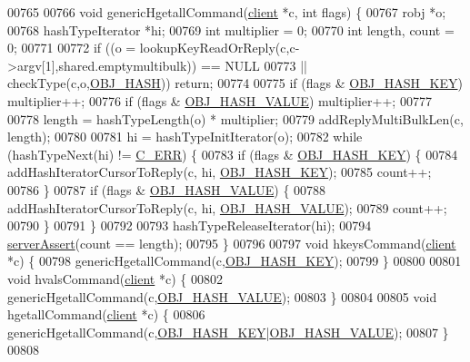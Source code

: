 \begin{DoxyCode}
00765 
00766 \textcolor{keywordtype}{void} genericHgetallCommand(\hyperlink{structclient}{client} *c, \textcolor{keywordtype}{int} flags) \{
00767     robj *o;
00768     hashTypeIterator *hi;
00769     \textcolor{keywordtype}{int} multiplier = 0;
00770     \textcolor{keywordtype}{int} length, count = 0;
00771 
00772     \textcolor{keywordflow}{if} ((o = lookupKeyReadOrReply(c,c->argv[1],shared.emptymultibulk)) == NULL
00773         || checkType(c,o,\hyperlink{server_8h_a87c05ba4f7f36741864277f02a4423fb}{OBJ\_HASH})) \textcolor{keywordflow}{return};
00774 
00775     \textcolor{keywordflow}{if} (flags & \hyperlink{server_8h_aede46b2a96d6f19aff38ccdac76598ac}{OBJ\_HASH\_KEY}) multiplier++;
00776     \textcolor{keywordflow}{if} (flags & \hyperlink{server_8h_a1f87a280688b29cd45aa3aa0dceac7c7}{OBJ\_HASH\_VALUE}) multiplier++;
00777 
00778     length = hashTypeLength(o) * multiplier;
00779     addReplyMultiBulkLen(c, length);
00780 
00781     hi = hashTypeInitIterator(o);
00782     \textcolor{keywordflow}{while} (hashTypeNext(hi) != \hyperlink{server_8h_af98ac28d5f4d23d7ed5985188e6fb7d1}{C\_ERR}) \{
00783         \textcolor{keywordflow}{if} (flags & \hyperlink{server_8h_aede46b2a96d6f19aff38ccdac76598ac}{OBJ\_HASH\_KEY}) \{
00784             addHashIteratorCursorToReply(c, hi, \hyperlink{server_8h_aede46b2a96d6f19aff38ccdac76598ac}{OBJ\_HASH\_KEY});
00785             count++;
00786         \}
00787         \textcolor{keywordflow}{if} (flags & \hyperlink{server_8h_a1f87a280688b29cd45aa3aa0dceac7c7}{OBJ\_HASH\_VALUE}) \{
00788             addHashIteratorCursorToReply(c, hi, \hyperlink{server_8h_a1f87a280688b29cd45aa3aa0dceac7c7}{OBJ\_HASH\_VALUE});
00789             count++;
00790         \}
00791     \}
00792 
00793     hashTypeReleaseIterator(hi);
00794     \hyperlink{server_8h_a88114b5169b4c382df6b56506285e56a}{serverAssert}(count == length);
00795 \}
00796 
00797 \textcolor{keywordtype}{void} hkeysCommand(\hyperlink{structclient}{client} *c) \{
00798     genericHgetallCommand(c,\hyperlink{server_8h_aede46b2a96d6f19aff38ccdac76598ac}{OBJ\_HASH\_KEY});
00799 \}
00800 
00801 \textcolor{keywordtype}{void} hvalsCommand(\hyperlink{structclient}{client} *c) \{
00802     genericHgetallCommand(c,\hyperlink{server_8h_a1f87a280688b29cd45aa3aa0dceac7c7}{OBJ\_HASH\_VALUE});
00803 \}
00804 
00805 \textcolor{keywordtype}{void} hgetallCommand(\hyperlink{structclient}{client} *c) \{
00806     genericHgetallCommand(c,\hyperlink{server_8h_aede46b2a96d6f19aff38ccdac76598ac}{OBJ\_HASH\_KEY}|\hyperlink{server_8h_a1f87a280688b29cd45aa3aa0dceac7c7}{OBJ\_HASH\_VALUE});
00807 \}
00808 

\end{DoxyCode}
